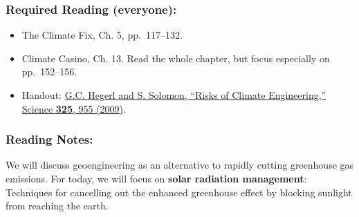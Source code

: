 \documentclass[
]{article}
\providecommand{\tightlist}{%
  \setlength{\itemsep}{0pt}\setlength{\parskip}{0pt}}
\begin{document}
\hypertarget{required-reading-everyone-30}{%
\subsubsection{Required Reading
(everyone):}\label{required-reading-everyone-30}}

\begin{itemize}
\tightlist
\item
  The Climate Fix, Ch. 5, pp.~117--132.
\item
  Climate Casino, Ch. 13. Read the whole chapter, but focus especially
  on pp.~152--156.
\item
  Handout:
  \href{http://science.sciencemag.org.proxy.library.vanderbilt.edu/content/325/5943/955}{G.C.
  Hegerl and S. Solomon, ``Risks of Climate Engineering,'' Science
  \textbf{325}, 955 (2009)}.
\end{itemize}

\hypertarget{reading-notes-27}{%
\subsubsection{Reading Notes:}\label{reading-notes-27}}

We will discuss geoengineering as an alternative to rapidly cutting
greenhouse gas emissions. For today, we will focus on \textbf{solar
radiation management}: Techniques for cancelling out the enhanced
greenhouse effect by blocking sunlight from reaching the earth.
\end{document}
